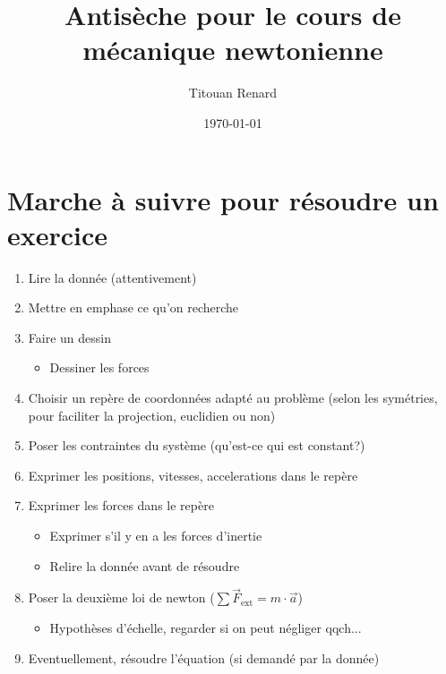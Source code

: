 \documentclass[11pt]{article}
\title{Antisèche pour le cours de mécanique newtonienne}
\date{\today}
\author{Titouan Renard}
\begin{document}
\maketitle	


\section{Marche à suivre pour résoudre un exercice}

\begin{enumerate}
    \item Lire la donnée (attentivement)
    \item Mettre en emphase ce qu'on recherche
    \item Faire un dessin
    \begin{itemize}
        \item Dessiner les forces
    \end{itemize}
    \item Choisir un repère de coordonnées adapté au problème (selon les symétries, pour faciliter la projection, euclidien ou non)
    \item Poser les contraintes du système (qu'est-ce qui est constant?)
    \item Exprimer les positions, vitesses, accelerations dans le repère
    \item Exprimer les forces dans le repère
    \begin{itemize}
        \item Exprimer s'il y en a les forces d'inertie
        \item Relire la donnée avant de résoudre
    \end{itemize}
    \item Poser la deuxième loi de newton ($\sum \vec{F}_\text{ext} = m \cdot \vec{a}$)
    \begin{itemize}
        \item Hypothèses d'échelle, regarder si on peut négliger qqch...
    \end{itemize}
    \item Eventuellement, résoudre l'équation (si demandé par la donnée)
\end{enumerate}
\end{document}
